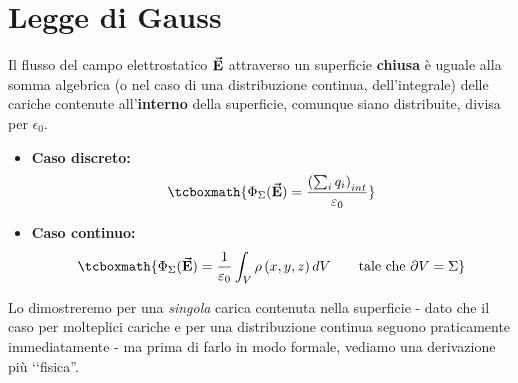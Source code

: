 \section{Legge di Gauss}
\begin{theorema}
	Il flusso del campo elettrostatico $\vb*{\va{E}}$ attraverso un superficie \textbf{chiusa} è uguale alla somma algebrica (\textrm{o nel caso di una distribuzione continua}, dell'integrale) delle cariche contenute all'\textbf{interno} della superficie, comunque siano distribuite, divisa per $\epsilon_0$.
	\begin{itemize}
		\item \textbf{Caso discreto:}
		\begin{equation}
			\tcboxmath{\Phi_\Sigma(\vba{E})=\frac{\left(\sum_i q_i\right)_{int}}{\epsilon_0}}\label{LeggeGaussDiscreta}
		\end{equation}
		\item \textbf{Caso continuo:}
		\begin{equation}
			\tcboxmath{\Phi_\Sigma(\vba{E})=\frac{1}{\epsilon_0}\int_{V}\rho\left(x,y,z\right)dV\qquad\text{tale che}\ \partial V=\Sigma}\label{LeggeGaussContinua}
		\end{equation}
	\end{itemize}
\end{theorema}
Lo dimostreremo per una \textit{singola} carica contenuta nella superficie - dato che il caso per molteplici cariche e per una distribuzione continua seguono praticamente immediatamente - ma prima di farlo in modo formale, vediamo una derivazione più ‘‘fisica''.
